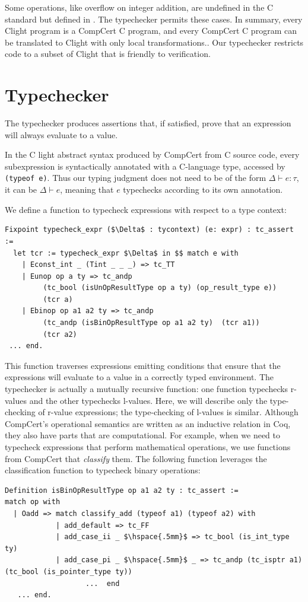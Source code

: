\documentclass{puthesis}
\begin{document}
Some operations, like overflow on integer addition, are undefined in
the C standard but defined in . The typechecker
permits these cases. In summary, every Clight program is a CompCert C
program, and every CompCert C program can be translated to Clight with
only local transformations.. Our typechecker restricts code to a
subset of Clight that is friendly to verification.

\section{Typechecker} 
\label{sec:typechecker}
The typechecker produces assertions that, if satisfied, prove that an
expression will always evaluate to a value.  

In the C light abstract syntax produced by CompCert from C source code,
every subexpression is syntactically annotated
with a C-language type, accessed by \lstinline{(typeof e)}. 
Thus our typing judgment does not need to be of the
form $\Delta \vdash e : \tau$, it can be
$\Delta \vdash e $, meaning that $e$ typechecks according to its
own annotation.

We define a function to typecheck expressions with respect to a type context:

\begin{lstlisting}
Fixpoint typecheck_expr ($\Delta$ : tycontext) (e: expr) : tc_assert :=
  let tcr := typecheck_expr $\Delta$ in $$ match e with
    | Econst_int _ (Tint _ _ _) => tc_TT 
    | Eunop op a ty => tc_andp 
         (tc_bool (isUnOpResultType op a ty) (op_result_type e)) 
         (tcr a) 
    | Ebinop op a1 a2 ty => tc_andp 
         (tc_andp (isBinOpResultType op a1 a2 ty)  (tcr a1)) 
         (tcr a2)
 ... end.
\end{lstlisting}

\noindent This function traverses expressions emitting conditions that
ensure that the expressions will evaluate to a value in a correctly
typed environment. The typechecker is actually a mutually recursive
function: one function typechecks r-values and the other typechecks
l-values.  Here, we will describe only the type-checking of r-value
expressions; the type-checking of l-values is similar.  Although
CompCert's operational semantics are written as an inductive relation
in Coq, they also have parts that are computational. For example, when
we need to typecheck expressions that perform mathematical operations,
we use functions from CompCert that \emph{classify} them. The
following function leverages the classification function to typecheck
binary operations:
\begin{lstlisting}
Definition isBinOpResultType op a1 a2 ty : tc_assert :=
match op with
  | Oadd => match classify_add (typeof a1) (typeof a2) with 
            | add_default => tc_FF
            | add_case_ii _ $\hspace{.5mm}$ => tc_bool (is_int_type ty) 
            | add_case_pi _ $\hspace{.5mm}$ _ => tc_andp (tc_isptr a1) (tc_bool (is_pointer_type ty)) 
                   ...  end   
   ... end.
\end{lstlisting}
\end{document}
